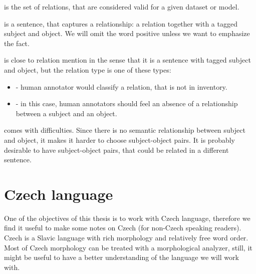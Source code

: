  is the set of relations, that are considered valid for a given dataset or model.

 is a sentence, that captures a relationship: a relation together with a tagged subject and object. We will omit the word positive unless we want to emphasize the fact.

 is close to relation mention in the sense that it is a sentence with tagged subject and object, but the relation type is one of these types: 
\begin{itemize}
\item {} - human annotator would classify a relation, that is not in inventory.
\item {} - in this case, human annotators should feel an absence of a relationship between a subject and an object. 



\end{itemize}

 comes with difficulties. Since there is no semantic relationship between subject and object, it makes it harder to choose subject-object pairs. It is probably desirable to have subject-object pairs, that could be related in a different sentence.

 

 


\section{Czech language}
One of the objectives of this thesis is to work with Czech language, therefore we find it useful to make some notes on Czech (for non-Czech speaking readers). Czech is a Slavic language with rich morphology and relatively free word order. Most of Czech morphology can be treated with a morphological analyzer, still, it might be useful to have a better understanding of the language we will work with.


